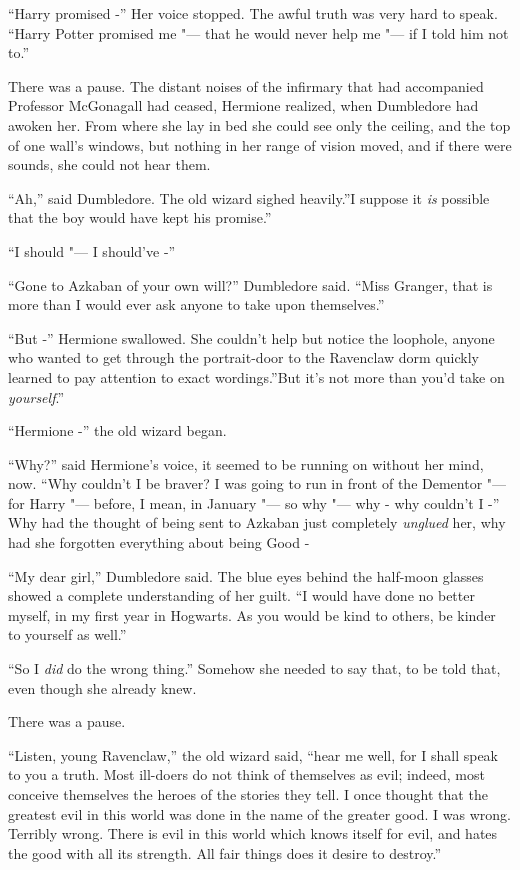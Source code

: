 ``Harry promised -'' Her voice stopped. The awful truth was very hard to
speak. ``Harry Potter promised me "--- that he would never help me "--- if I
told him not to.''

There was a pause. The distant noises of the infirmary that had
accompanied Professor McGonagall had ceased, Hermione realized, when
Dumbledore had awoken her. From where she lay in bed she could see only
the ceiling, and the top of one wall's windows, but nothing in her range
of vision moved, and if there were sounds, she could not hear them.

``Ah,'' said Dumbledore. The old wizard sighed heavily.''I suppose it
\emph{is} possible that the boy would have kept his promise.''

``I should "--- I should've -''

``Gone to Azkaban of your own will?'' Dumbledore said. ``Miss Granger,
that is more than I would ever ask anyone to take upon themselves.''

``But -'' Hermione swallowed. She couldn't help but notice the loophole,
anyone who wanted to get through the portrait-door to the Ravenclaw dorm
quickly learned to pay attention to exact wordings.''But it's not more
than you'd take on \emph{yourself}.''

``Hermione -'' the old wizard began.

``Why?'' said Hermione's voice, it seemed to be running on without her
mind, now. ``Why couldn't I be braver? I was going to run in front of
the Dementor "--- for Harry "--- before, I mean, in January "--- so why "--- why -
why couldn't I -'' Why had the thought of being sent to Azkaban just
completely \emph{unglued} her, why had she forgotten everything about
being Good -

``My dear girl,'' Dumbledore said. The blue eyes behind the half-moon
glasses showed a complete understanding of her guilt. ``I would have
done no better myself, in my first year in Hogwarts. As you would be
kind to others, be kinder to yourself as well.''

``So I \emph{did} do the wrong thing.'' Somehow she needed to say that,
to be told that, even though she already knew.

There was a pause.

``Listen, young Ravenclaw,'' the old wizard said, ``hear me well, for I
shall speak to you a truth. Most ill-doers do not think of themselves as
evil; indeed, most conceive themselves the heroes of the stories they
tell. I once thought that the greatest evil in this world was done in
the name of the greater good. I was wrong. Terribly wrong. There is evil
in this world which knows itself for evil, and hates the good with all
its strength. All fair things does it desire to destroy.''

